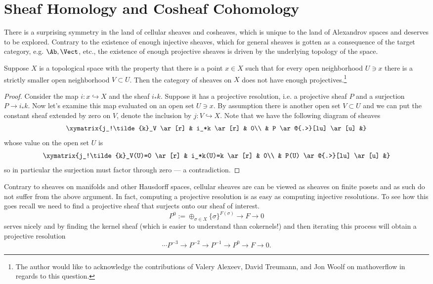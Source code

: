 \section{Sheaf Homology and Cosheaf Cohomology}
\label{subsec:sheaf_homology}

There is a surprising symmetry in the land of cellular sheaves and cosheaves, which is unique to the land of Alexandrov spaces and deserves to be explored. Contrary to the existence of enough injective sheaves, which for general sheaves is gotten as a consequence of the target category, e.g. $\Ab,\Vect$, etc., the existence of enough projective sheaves is driven by the underlying topology of the space.

\begin{prop}
 Suppose $X$ is a topological space with the property that there is a point $x\in X$ such that for every open neighborhood $U\ni x$ there is a strictly smaller open neighborhood $V\subset U$. Then the category of sheaves on $X$ does not have enough projectives.\footnote{The author would like to acknowledge the contributions of Valery Alexeev, David Treumann, and Jon Woolf on mathoverflow in regards to this question.}
\end{prop}
\begin{proof}
 Consider the map $i:x\hookrightarrow X$ and the sheaf $i_*k$. Suppose it has a projective resolution, i.e. a projective sheaf $P$ and a surjection $P\to i_*k$. Now let's examine this map evaluated on an open set $U\ni x$. By assumption there is another open set $V\subset U$ and we can put the constant sheaf extended by zero on $V$, denote the inclusion by $j:V\hookrightarrow X$. Note that we have the following diagram of sheaves
\[
 \xymatrix{j_!\tilde{k}_V \ar[r] & i_*k \ar[r] & 0\\ & P \ar@{.>}[lu] \ar[u] &}
\]
whose value on the open set $U$ is
\[
 \xymatrix{j_!\tilde{k}_V(U)=0 \ar[r] & i_*k(U)=k \ar[r] & 0\\ & P(U) \ar@{.>}[lu] \ar[u] &}
\]
so in particular the surjection must factor through zero --- a contradiction.
\end{proof}

Contrary to sheaves on manifolds and other Hausdorff spaces, cellular sheaves are can be viewed as sheaves on finite posets and as such do not suffer from the above argument. In fact, computing a projective resolution is as easy as computing injective resolutions. To see how this goes recall we need to find a projective sheaf that surjects onto our sheaf of interest. 
\[
 P^0:=\oplus_{\sigma\in X} \{\sigma\}^{F(\sigma)} \to F \to 0
\]
 serves nicely and by finding the kernel sheaf (which is easier to understand than cokernels!) and then iterating this process will obtain a projective resolution
\[
 \cdots P^{-3}\to P^{-2} \to P^{-1} \to P^0 \to F \to 0.
\]

